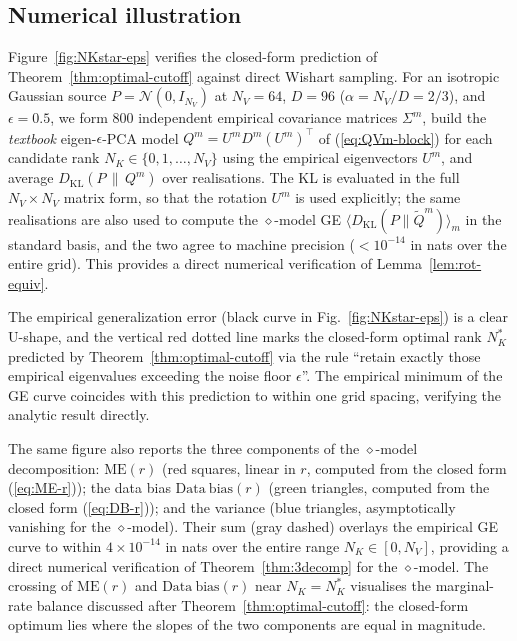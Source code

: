 \documentclass[11pt,a4paper]{article}
\theoremstyle{definition}
\theoremstyle{remark}
\newcommand{\KL}{D_{\mathrm{KL}}}
\newcommand{\PV}{P}
\newcommand{\QVm}{Q^{m}}
\newcommand{\NK}{N_K}
\newcommand{\NV}{N_V}
\begin{document}
\subsection{Numerical illustration}
\label{sec:epca-numerics}

Figure~\ref{fig:NKstar-eps} verifies the closed-form prediction
of Theorem~\ref{thm:optimal-cutoff} against direct Wishart
sampling. For an isotropic Gaussian source
$\PV = \mathcal{N}(0, I_{\NV})$ at $\NV = 64$, $D = 96$
($\alpha = \NV / D = 2/3$), and $\epsilon = 0.5$, we form $800$
independent empirical covariance matrices $\Sigma^{m}$, build the
\emph{textbook} eigen-$\epsilon$-PCA model
$\QVm = U^{m}D^{m}(U^{m})^{\top}$ of (\ref{eq:QVm-block}) for
each candidate rank $\NK \in \{0,1,\ldots,\NV\}$ using the
empirical eigenvectors $U^{m}$, and average
$\KL(\PV \,\|\, \QVm)$ over realisations. The KL is evaluated
in the full $\NV \times \NV$ matrix form, so that the rotation
$U^{m}$ is used explicitly; the same realisations are also used
to compute the $\diamond$-model GE
$\langle\KL(\PV\|\widetilde{Q}^{m})\rangle_{m}$ in the standard
basis, and the two agree to machine precision
($< 10^{-14}$ in nats over the entire grid). This provides a
direct numerical verification of
Lemma~\ref{lem:rot-equiv}.

The empirical generalization error (black curve in
Fig.~\ref{fig:NKstar-eps}) is a clear U-shape, and the vertical
red dotted line marks the closed-form optimal rank $\NK^{*}$
predicted by Theorem~\ref{thm:optimal-cutoff} via the rule
``retain exactly those empirical eigenvalues exceeding the noise
floor $\epsilon$''. The empirical minimum of the GE curve
coincides with this prediction to within one grid spacing,
verifying the analytic result directly.

The same figure also reports the three components of the
$\diamond$-model decomposition: $\mathrm{ME}(r)$ (red squares,
linear in $r$, computed from the closed form (\ref{eq:ME-r}));
the data bias $\mathrm{Data\ bias}(r)$ (green triangles,
computed from the closed form (\ref{eq:DB-r})); and the
variance (blue triangles, asymptotically vanishing for the
$\diamond$-model). Their sum (gray dashed) overlays the
empirical GE curve to within $4\!\times\!10^{-14}$ in nats over
the entire range $\NK \in [0, \NV]$, providing a direct
numerical verification of Theorem~\ref{thm:3decomp} for the
$\diamond$-model. The crossing of $\mathrm{ME}(r)$ and
$\mathrm{Data\ bias}(r)$ near $\NK = \NK^{*}$ visualises the
marginal-rate balance discussed after Theorem~\ref{thm:optimal-cutoff}:
the closed-form optimum lies where the slopes of the two
components are equal in magnitude.
\end{document}
